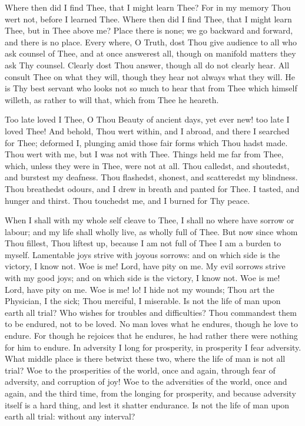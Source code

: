 \documentclass[b5paper,openright,12pt,twoside]{book}
\begin{document}
Where then did I find Thee, that I might learn Thee? For in my memory
Thou wert not, before I learned Thee. Where then did I find Thee, that
I might learn Thee, but in Thee above me? Place there is none; we go
backward and forward, and there is no place. Every where, O Truth, dost
Thou give audience to all who ask counsel of Thee, and at once answerest
all, though on manifold matters they ask Thy counsel. Clearly dost Thou
answer, though all do not clearly hear. All consult Thee on what they
will, though they hear not always what they will. He is Thy best servant
who looks not so much to hear that from Thee which himself willeth, as
rather to will that, which from Thee he heareth.

Too late loved I Thee, O Thou Beauty of ancient days, yet ever new! too
late I loved Thee! And behold, Thou wert within, and I abroad, and there
I searched for Thee; deformed I, plunging amid those fair forms which
Thou hadst made. Thou wert with me, but I was not with Thee. Things held
me far from Thee, which, unless they were in Thee, were not at all.
Thou calledst, and shoutedst, and burstest my deafness. Thou flashedst,
shonest, and scatteredst my blindness. Thou breathedst odours, and I
drew in breath and panted for Thee. I tasted, and hunger and thirst.
Thou touchedst me, and I burned for Thy peace.

When I shall with my whole self cleave to Thee, I shall no where have
sorrow or labour; and my life shall wholly live, as wholly full of Thee.
But now since whom Thou fillest, Thou liftest up, because I am not full
of Thee I am a burden to myself. Lamentable joys strive with joyous
sorrows: and on which side is the victory, I know not. Woe is me! Lord,
have pity on me. My evil sorrows strive with my good joys; and on which
side is the victory, I know not. Woe is me! Lord, have pity on me. Woe
is me! lo! I hide not my wounds; Thou art the Physician, I the sick;
Thou merciful, I miserable. Is not the life of man upon earth all trial?
Who wishes for troubles and difficulties? Thou commandest them to be
endured, not to be loved. No man loves what he endures, though he love
to endure. For though he rejoices that he endures, he had rather there
were nothing for him to endure. In adversity I long for prosperity, in
prosperity I fear adversity. What middle place is there betwixt these
two, where the life of man is not all trial? Woe to the prosperities of
the world, once and again, through fear of adversity, and corruption of
joy! Woe to the adversities of the world, once and again, and the third
time, from the longing for prosperity, and because adversity itself is
a hard thing, and lest it shatter endurance. Is not the life of man upon
earth all trial: without any interval?
\end{document}
